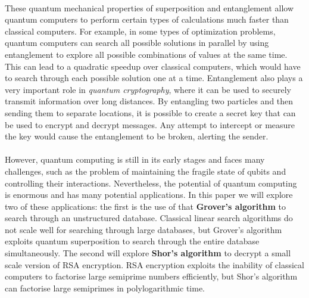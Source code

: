 \documentclass{article}[11pt]
\begin{document}
\\
These quantum mechanical properties of superposition and entanglement allow quantum computers to perform certain types of calculations much faster than classical computers. For example, in some types of optimization problems, quantum computers can search all possible solutions in parallel by using entanglement to explore all possible combinations of values at the same time.\cite{candela} This can lead to a quadratic speedup over classical computers, which would have to search through each possible solution one at a time. Entanglement also plays a very important role in \textit{quantum cryptography}, where it can be used to securely transmit information over long distances. By entangling two particles and then sending them to separate locations, it is possible to create a secret key that can be used to encrypt and decrypt messages.\cite{quantumcrypt} Any attempt to intercept or measure the key would cause the entanglement to be broken, alerting the sender.\\
\\
However, quantum computing is still in its early stages and faces many challenges, such as the problem of maintaining the fragile state of qubits and controlling their interactions. Nevertheless, the potential of quantum computing is enormous and has many potential applications. In this paper we will explore two of these applications: the first is the use of that \textbf{Grover's algorithm} to search through an unstructured database. Classical linear search algorithms do not scale well for searching through large databases, but Grover's algorithm exploits quantum superposition to search through the entire database simultaneously.\cite{grover} The second will explore \textbf{Shor's algorithm} to decrypt a small scale version of RSA encryption. RSA encryption exploits the inability of classical computers to factorise large semiprime numbers efficiently,\cite{RSA} but Shor's algorithm can factorise large semiprimes in polylogarithmic time.\cite{Shors_algorithm}
\end{document}
